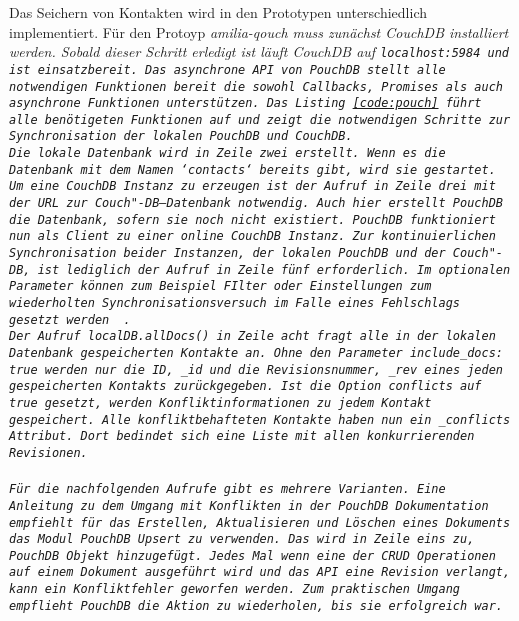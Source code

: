 Das Seichern von Kontakten wird in den Prototypen unterschiedlich implementiert.
%
%
Für den Protoyp \it{amilia-qouch} muss zunächst CouchDB installiert werden.
Sobald dieser Schritt erledigt ist läuft CouchDB auf \tt{localhost:5984} und ist einsatzbereit.
Das asynchrone \gls{API} von PouchDB stellt alle notwendigen Funktionen bereit die sowohl Callbacks, Promises als auch asynchrone Funktionen unterstützen. 
Das Listing \ref{code:pouch} führt alle benötigeten Funktionen auf und zeigt die notwendigen Schritte zur Synchronisation der lokalen PouchDB und CouchDB.\\
Die lokale Datenbank wird in Zeile zwei erstellt. Wenn es die Datenbank mit dem Namen `contacts` bereits gibt, wird sie gestartet.\\
Um eine CouchDB Instanz zu erzeugen ist der Aufruf in Zeile drei mit der URL zur Couch"-DB--Datenbank notwendig. Auch hier erstellt PouchDB die Datenbank, sofern sie noch nicht existiert. PouchDB funktioniert nun als Client zu einer online CouchDB Instanz.
Zur kontinuierlichen Synchronisation beider Instanzen, der lokalen PouchDB und der Couch"-DB, ist lediglich der Aufruf in Zeile fünf erforderlich. Im optionalen Parameter können zum Beispiel FIlter oder Einstellungen zum wiederholten Synchronisationsversuch im Falle eines Fehlschlags gesetzt werden ~\cite{pouch_options}.\\
Der Aufruf \tt{localDB.allDocs()} in Zeile acht fragt alle in der lokalen Datenbank gespeicherten Kontakte an.
Ohne den Parameter \tt{include\_docs: true} werden nur die ID, \tt{\_id} und die Revisionsnummer, \tt{\_rev} eines jeden gespeicherten Kontakts zurückgegeben.
Ist die Option \tt{conflicts} auf \tt{true} gesetzt, werden Konfliktinformationen zu jedem Kontakt gespeichert. Alle konfliktbehafteten Kontakte haben nun ein \tt{\_conflicts} Attribut. Dort bedindet sich eine Liste mit allen konkurrierenden Revisionen.\\\\
%
Für die nachfolgenden Aufrufe gibt es mehrere Varianten. Eine Anleitung zu dem Umgang mit Konflikten in der PouchDB Dokumentation empfiehlt für das Erstellen, Aktualisieren und Löschen eines Dokuments das Modul PouchDB Upsert zu verwenden. Das wird in Zeile eins zu, PouchDB Objekt hinzugefügt. Jedes Mal wenn eine der \gls{CRUD} Operationen auf einem Dokument ausgeführt wird und das \gls{API} eine Revision verlangt, kann ein Konfliktfehler geworfen werden. Zum praktischen Umgang empflieht PouchDB die Aktion zu wiederholen, bis sie erfolgreich war.
